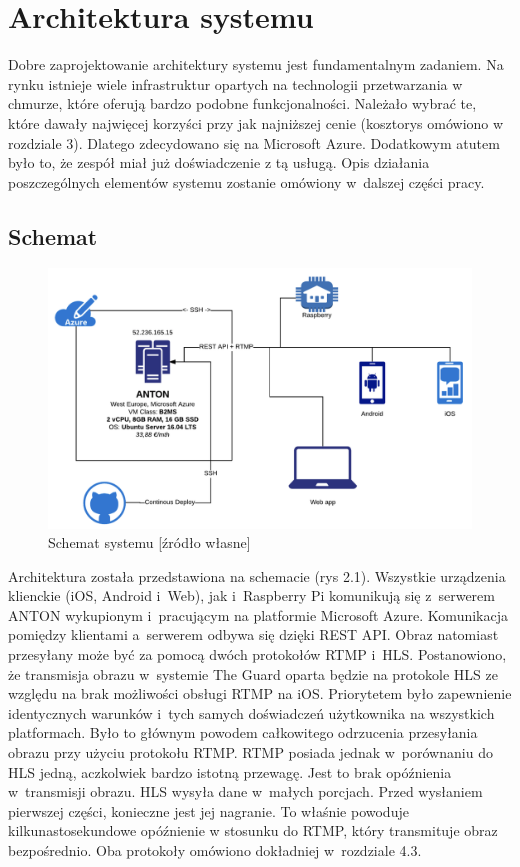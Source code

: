 \chapter{Architektura systemu}

Dobre zaprojektowanie architektury systemu jest fundamentalnym zadaniem. Na rynku istnieje wiele infrastruktur opartych na technologii przetwarzania w chmurze, które oferują bardzo podobne funkcjonalności. Należało wybrać te, które dawały najwięcej korzyści przy jak najniższej cenie (kosztorys omówiono w rozdziale 3). Dlatego zdecydowano się na Microsoft Azure. Dodatkowym atutem było to, że zespół miał już doświadczenie z tą usługą. Opis działania poszczególnych elementów systemu zostanie omówiony w~dalszej części pracy.

\section{Schemat}

\begin{figure}[ht] 
   \centering
   \includegraphics[width=12cm]{anton.png} 
   \caption{Schemat systemu [źródło własne]}
\end{figure}

Architektura została przedstawiona na schemacie (rys 2.1). Wszystkie urządzenia klienckie (iOS, Android i~Web), jak i~Raspberry Pi komunikują się z~serwerem ANTON wykupionym i~pracującym na platformie Microsoft Azure. Komunikacja pomiędzy klientami a~serwerem odbywa się dzięki REST API. Obraz natomiast przesyłany może być za pomocą dwóch protokołów RTMP i~HLS. Postanowiono, że transmisja obrazu w~systemie The Guard oparta będzie na protokole HLS ze względu na brak możliwości obsługi RTMP na iOS. Priorytetem było zapewnienie identycznych warunków i~tych samych doświadczeń użytkownika na wszystkich platformach. Było to głównym powodem całkowitego odrzucenia przesyłania obrazu przy użyciu protokołu RTMP. RTMP posiada jednak w~porównaniu do HLS jedną, aczkolwiek bardzo istotną przewagę. Jest to brak opóźnienia w~transmisji obrazu. HLS wysyła dane w~małych porcjach. Przed wysłaniem pierwszej części, konieczne jest jej nagranie. To właśnie powoduje kilkunastosekundowe opóźnienie w stosunku do RTMP, który transmituje obraz bezpośrednio. Oba protokoły omówiono dokładniej w~rozdziale 4.3.

